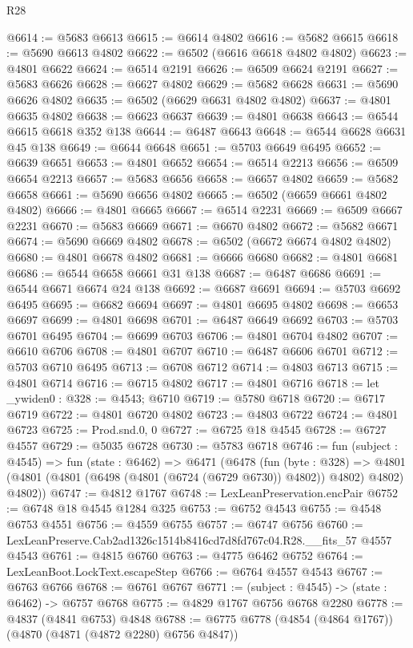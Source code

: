 \begin{lexlean}{R28}
\begin{coremodule}
@6614 := @5683 @6613
@6615 := @6614 @4802
@6616 := @5682 @6615
@6618 := @5690 @6613 @4802
@6622 := @6502 (@6616 @6618 @4802 @4802)
@6623 := @4801 @6622
@6624 := @6514 @2191
@6626 := @6509 @6624 @2191
@6627 := @5683 @6626
@6628 := @6627 @4802
@6629 := @5682 @6628
@6631 := @5690 @6626 @4802
@6635 := @6502 (@6629 @6631 @4802 @4802)
@6637 := @4801 @6635 @4802
@6638 := @6623 @6637
@6639 := @4801 @6638
@6643 := @6544 @6615 @6618 @352 @138
@6644 := @6487 @6643
@6648 := @6544 @6628 @6631 @45 @138
@6649 := @6644 @6648
@6651 := @5703 @6649 @6495
@6652 := @6639 @6651
@6653 := @4801 @6652
@6654 := @6514 @2213
@6656 := @6509 @6654 @2213
@6657 := @5683 @6656
@6658 := @6657 @4802
@6659 := @5682 @6658
@6661 := @5690 @6656 @4802
@6665 := @6502 (@6659 @6661 @4802 @4802)
@6666 := @4801 @6665
@6667 := @6514 @2231
@6669 := @6509 @6667 @2231
@6670 := @5683 @6669
@6671 := @6670 @4802
@6672 := @5682 @6671
@6674 := @5690 @6669 @4802
@6678 := @6502 (@6672 @6674 @4802 @4802)
@6680 := @4801 @6678 @4802
@6681 := @6666 @6680
@6682 := @4801 @6681
@6686 := @6544 @6658 @6661 @31 @138
@6687 := @6487 @6686
@6691 := @6544 @6671 @6674 @24 @138
@6692 := @6687 @6691
@6694 := @5703 @6692 @6495
@6695 := @6682 @6694
@6697 := @4801 @6695 @4802
@6698 := @6653 @6697
@6699 := @4801 @6698
@6701 := @6487 @6649 @6692
@6703 := @5703 @6701 @6495
@6704 := @6699 @6703
@6706 := @4801 @6704 @4802
@6707 := @6610 @6706
@6708 := @4801 @6707
@6710 := @6487 @6606 @6701
@6712 := @5703 @6710 @6495
@6713 := @6708 @6712
@6714 := @4803 @6713
@6715 := @4801 @6714
@6716 := @6715 @4802
@6717 := @4801 @6716
@6718 := let _ywiden0 : @328 := @4543; @6710
@6719 := @5780 @6718
@6720 := @6717 @6719
@6722 := @4801 @6720 @4802
@6723 := @4803 @6722
@6724 := @4801 @6723
@6725 := Prod.snd.{0, 0}
@6727 := @6725 @18 @4545
@6728 := @6727 @4557
@6729 := @5035 @6728
@6730 := @5783 @6718
@6746 := fun (subject : @4545) =>
  fun (state : @6462) =>
  @6471
    (@6478
      (fun (byte : @328) =>
      @4801 (@4801 (@4801 (@6498 (@4801 (@6724 (@6729 @6730)) @4802)) @4802) @4802) @4802))
@6747 := @4812 @1767
@6748 := LexLeanPreservation.encPair
@6752 := @6748 @18 @4545 @1284 @325
@6753 := @6752 @4543
@6755 := @4548 @6753 @4551
@6756 := @4559 @6755
@6757 := @6747 @6756
@6760 := LexLeanPreserve.Cab2ad1326c1514b8416cd7d8fd767c04.R28.__fits_57 @4557 @4543
@6761 := @4815 @6760
@6763 := @4775 @6462 @6752
@6764 := LexLeanBoot.LockText.escapeStep
@6766 := @6764 @4557 @4543
@6767 := @6763 @6766
@6768 := @6761 @6767
@6771 := (subject : @4545) -> (state : @6462) -> @6757 @6768
@6775 := @4829 @1767 @6756 @6768 @2280
@6778 := @4837 (@4841 @6753) @4848
@6788 := @6775 @6778 (@4854 (@4864 @1767)) (@4870 (@4871 (@4872 @2280) @6756 @4847))

\end{coremodule}
\end{lexlean}
